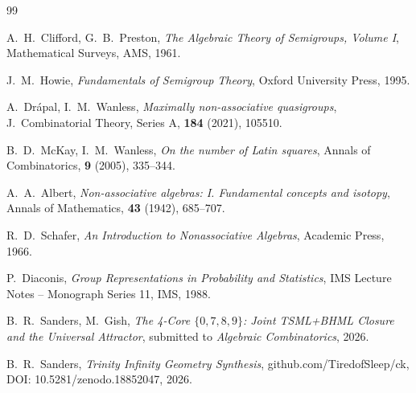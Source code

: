 \documentclass[11pt,reqno]{amsart}
\theoremstyle{plain}
\theoremstyle{definition}
\theoremstyle{remark}
\begin{document}
\begin{thebibliography}{99}

A.~H.~Clifford, G.~B.~Preston,
\emph{The Algebraic Theory of Semigroups, Volume I},
Mathematical Surveys, AMS, 1961.

J.~M.~Howie,
\emph{Fundamentals of Semigroup Theory},
Oxford University Press, 1995.

A.~Drápal, I.~M.~Wanless,
\emph{Maximally non-associative quasigroups},
J.~Combinatorial Theory, Series A, \textbf{184} (2021), 105510.

B.~D.~McKay, I.~M.~Wanless,
\emph{On the number of Latin squares},
Annals of Combinatorics, \textbf{9} (2005), 335--344.

A.~A.~Albert,
\emph{Non-associative algebras: I. Fundamental concepts and isotopy},
Annals of Mathematics, \textbf{43} (1942), 685--707.

R.~D.~Schafer,
\emph{An Introduction to Nonassociative Algebras},
Academic Press, 1966.

P.~Diaconis,
\emph{Group Representations in Probability and Statistics},
IMS Lecture Notes -- Monograph Series 11, IMS, 1988.

B.~R.~Sanders, M.~Gish,
\emph{The 4-Core $\{0,7,8,9\}$: Joint TSML+BHML Closure and the
Universal Attractor},
submitted to \emph{Algebraic Combinatorics}, 2026.

B.~R.~Sanders,
\emph{Trinity Infinity Geometry Synthesis},
github.com/TiredofSleep/ck, DOI: 10.5281/zenodo.18852047, 2026.

\end{thebibliography}
\end{document}
